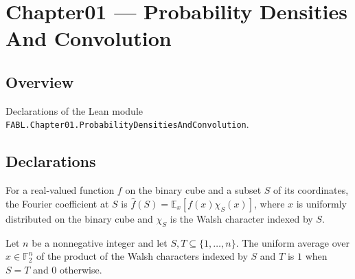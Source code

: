 \chapter{Chapter01 — Probability Densities And Convolution}
\section{Overview}

Declarations of the Lean module \texttt{FABL.Chapter01.ProbabilityDensitiesAndConvolution}.

\section{Declarations}

\begin{definition}
\label{FABL.binaryFourierCoeff}
\leanok
{}
For a real-valued function $f$ on the binary cube and a subset $S$ of its coordinates,
the Fourier coefficient at $S$ is $\widehat f(S)=\mathbb E_x[f(x)\chi_S(x)]$, where $x$
is uniformly distributed on the binary cube and $\chi_S$ is the Walsh character indexed
by $S$.
\end{definition}

\begin{theorem}
\label{FABL.expect_binaryWalshCharacter_mul}
\leanok
{}
Let $n$ be a nonnegative integer and let $S,T\subseteq\{1,\ldots,n\}$. The uniform
average over $x\in\mathbb{F}_2^n$ of the product of the Walsh characters indexed by $S$
and $T$ is $1$ when $S=T$ and $0$ otherwise.
\end{theorem}

